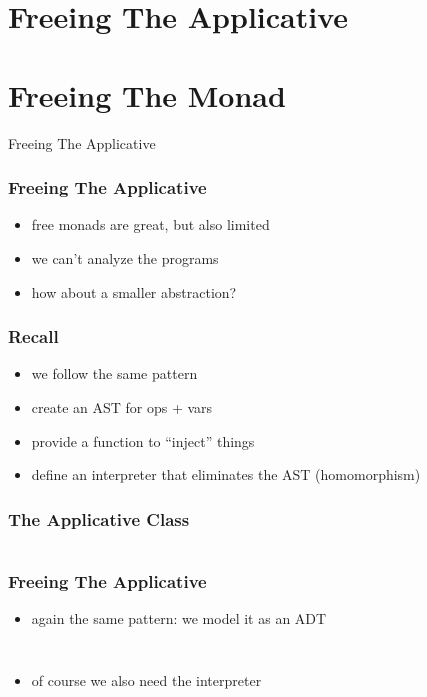 \documentclass{beamer}
\newcommand{\recipe}{%
  \begin{itemize}
  \item create an AST for ops + vars
  \item provide a function to ``inject'' things
  \item define an interpreter that eliminates the AST (homomorphism)
  \end{itemize}
}
\begin{document}
\section{Freeing The Applicative}\label{sec:free-applicative}

\section{Freeing The Monad}\label{sec:free-monad}
\begin{frame}
  \begin{center}
    \Huge
    Freeing The Applicative
  \end{center}
\end{frame}

\begin{frame}
  \frametitle{Freeing The Applicative}
  \begin{itemize}
  \item free monads are great, but also limited
  \item we can't analyze the programs
  \item how about a smaller abstraction?
  \end{itemize}
\end{frame}

\begin{frame}
  \frametitle{Recall}
  \begin{itemize}
  \item we follow the same pattern
  \end{itemize}
  \recipe{}
\end{frame}

\begin{frame}[fragile]
  \frametitle{The Applicative Class}
  \inputminted{scala}{snippets/applicative-typeclass.scala}
\end{frame}

\begin{frame}[fragile]
  \frametitle{Freeing The Applicative}
  \begin{itemize}
  \item again the same pattern: we model it as an ADT
  \end{itemize}
    \inputminted{scala}{snippets/free-applicative.scala}
  \begin{verbatim}
\end{verbatim}
\begin{itemize}
\item of course we also need the interpreter
\end{itemize}
\end{frame}
\end{document}
